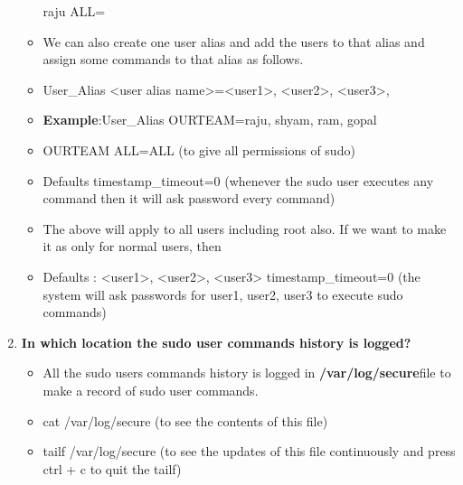 \begin{enumerate}
\begin{itemize}
                \newline
          raju		ALL=
          \item We can also create one user alias and add the users to that alias and assign some commands to that alias as follows.
          \item User_Alias	<user alias name>=<user1>, <user2>, <user3>, 
          \item \textbf{Example}:User_Alias	OURTEAM=raju, shyam, ram, gopal
          \item OURTEAM	ALL=ALL (to give all permissions of sudo)
          \item Defaults  timestamp_timeout=0 (whenever the sudo user executes any command then it will ask password every command)
          \item The above will apply to all users including root also. If we want to make it as only for normal users, then
          \item Defaults  :  <user1>, <user2>, <user3>  timestamp_timeout=0 (the system will ask passwords for user1, user2, user3 to execute sudo commands) 
       \end{itemize}
    
    \bigskip
    \bigskip

    \item\textbf{In which location the sudo  user commands history is logged?}
    \newline
    \begin{itemize}
        \item All the sudo users commands history is logged in  \textbf{/var/log/secure}file to make a record of sudo user commands.
        \item cat   /var/log/secure	(to see the contents of this file)
        \item tailf   /var/log/secure	(to see the updates of this file continuously and press  ctrl + c to quit the tailf)
    \end{itemize}

    \bigskip
    \bigskip


\end{enumerate}
